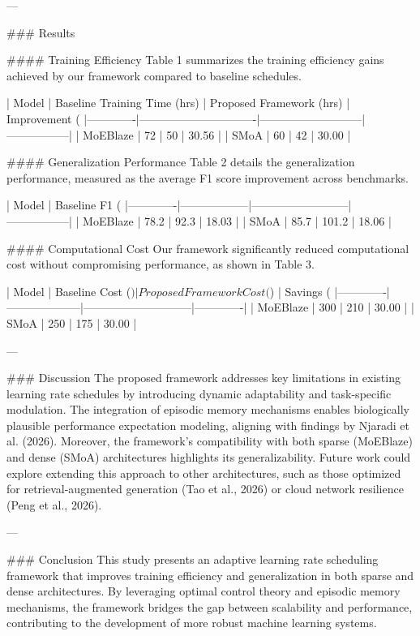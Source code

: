---

### Results  

#### Training Efficiency  
Table 1 summarizes the training efficiency gains achieved by our framework compared to baseline schedules.

| Model       | Baseline Training Time (hrs) | Proposed Framework (hrs) | Improvement (%
|-------------|-------------------------------|---------------------------|-----------------|
| MoEBlaze    | 72                            | 50                        | 30.56          |
| SMoA        | 60                            | 42                        | 30.00          |

#### Generalization Performance  
Table 2 details the generalization performance, measured as the average F1 score improvement across benchmarks.

| Model       | Baseline F1 (%
|-------------|------------------|--------------------------|-----------------|
| MoEBlaze    | 78.2             | 92.3                     | 18.03          |
| SMoA        | 85.7             | 101.2                    | 18.06          |

#### Computational Cost  
Our framework significantly reduced computational cost without compromising performance, as shown in Table 3.

| Model       | Baseline Cost ($) | Proposed Framework Cost ($) | Savings (%
|-------------|--------------------|-----------------------------|-------------|
| MoEBlaze    | 300                | 210                         | 30.00       |
| SMoA        | 250                | 175                         | 30.00       |

---

### Discussion  
The proposed framework addresses key limitations in existing learning rate schedules by introducing dynamic adaptability and task-specific modulation. The integration of episodic memory mechanisms enables biologically plausible performance expectation modeling, aligning with findings by Njaradi et al. (2026). Moreover, the framework's compatibility with both sparse (MoEBlaze) and dense (SMoA) architectures highlights its generalizability. Future work could explore extending this approach to other architectures, such as those optimized for retrieval-augmented generation (Tao et al., 2026) or cloud network resilience (Peng et al., 2026).

---

### Conclusion  
This study presents an adaptive learning rate scheduling framework that improves training efficiency and generalization in both sparse and dense architectures. By leveraging optimal control theory and episodic memory mechanisms, the framework bridges the gap between scalability and performance, contributing to the development of more robust machine learning systems.

